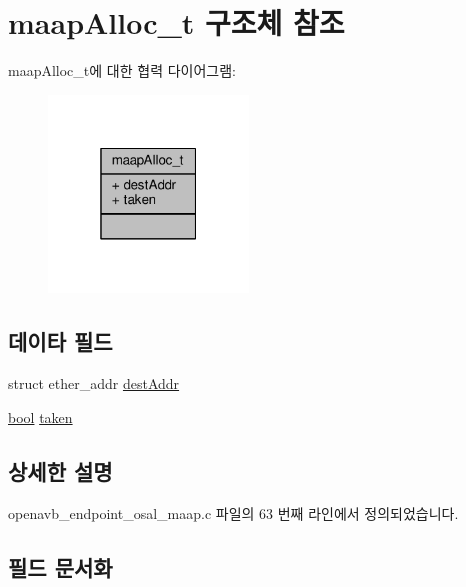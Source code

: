 \hypertarget{structmaap_alloc__t}{}\section{maap\+Alloc\+\_\+t 구조체 참조}
\label{structmaap_alloc__t}


maap\+Alloc\+\_\+t에 대한 협력 다이어그램\+:
\nopagebreak
\begin{figure}[H]
\begin{center}
\leavevmode
\includegraphics[width=151pt]{structmaap_alloc__t__coll__graph}
\end{center}
\end{figure}
\subsection*{데이타 필드}
\begin{DoxyCompactItemize}
\item 
struct ether\+\_\+addr \hyperlink{structmaap_alloc__t_ae93ae3d7d2964e3559e9b0df6f477238}{dest\+Addr}
\item 
\hyperlink{avb__gptp_8h_af6a258d8f3ee5206d682d799316314b1}{bool} \hyperlink{structmaap_alloc__t_a2f82d1d1293c3de8527c67be4b2880f9}{taken}
\end{DoxyCompactItemize}


\subsection{상세한 설명}


openavb\+\_\+endpoint\+\_\+osal\+\_\+maap.\+c 파일의 63 번째 라인에서 정의되었습니다.



\subsection{필드 문서화}
